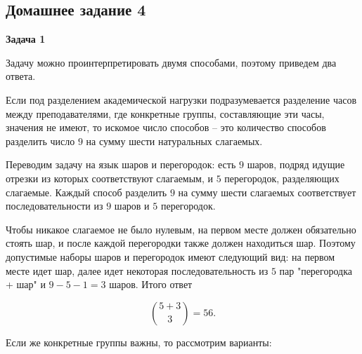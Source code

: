 \subsection{Домашнее задание 4}


	\begin{center}
    \textbf{Задача 1}
\end{center}
		Задачу можно проинтерпретировать двумя способами, поэтому приведем два ответа.

		Если под разделением академической нагрузки подразумевается разделение часов между преподавателями, где конкретные группы, составляющие эти часы, значения не имеют, то искомое число способов -- это количество способов разделить число $9$ на сумму шести натуральных слагаемых.

		Переводим задачу на язык шаров и перегородок: есть $9$ шаров, подряд идущие отрезки из которых соответствуют слагаемым, и $5$ перегородок, разделяющих слагаемые. Каждый способ разделить $9$ на сумму шести слагаемых соответствует последовательности из $9$ шаров и $5$ перегородок.

		Чтобы никакое слагаемое не было нулевым, на первом месте должен обязательно стоять шар, и после каждой перегородки также должен находиться шар. Поэтому допустимые наборы шаров и перегородок имеют следующий вид: на первом месте идет шар, далее идет некоторая последовательность из $5$ пар "перегородка + шар" и $9 - 5 - 1 = 3$ шаров. Итого ответ

		\begin{equation*}
			\binom{5 + 3}{3} = 56.
		\end{equation*}

		Если же конкретные группы важны, то рассмотрим варианты:

